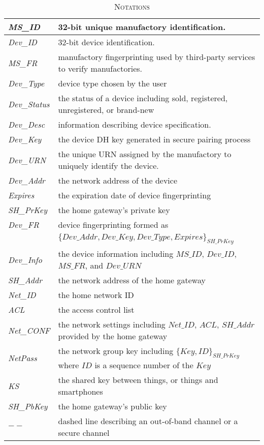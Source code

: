 \begin{table}[t]
\centering
\caption{\textsc{Notations}}
\label{notation}
{\small
\begin{tabular}{| l | p{9cm} |}
 \hline
\emph{MS\_ID} & 32-bit unique manufactory identification. \\ \hline
\emph{Dev\_ID} & 32-bit device identification. \\ \hline
\emph{MS\_FR} & manufactory fingerprinting used by third-party services to verify manufactories. \\ \hline
\emph{Dev\_Type} & device type chosen by the user \\ \hline
\emph{Dev\_Status} & the status of a device including sold, registered, unregistered, or brand-new \\ \hline
\emph{Dev\_Desc} & information describing device specification. \\ \hline
\emph{Dev\_Key} & the device DH key generated in secure pairing process \\ \hline
\emph{Dev\_URN} & the unique URN assigned by the manufactory to uniquely identify the device. \\ \hline
\emph{Dev\_Addr} & the network address of the device \\ \hline
\emph{Expires} & the expiration date of device fingerprinting \\ \hline
\emph{SH\_PrKey} & the home gateway's private key \\ \hline
\emph{Dev\_FR} & device fingerprinting formed as \\
 & $\{Dev\_Addr, Dev\_Key, Dev\_Type, Expires\}_{SH\_PrKey}$ \\ \hline
\emph{Dev\_Info} & the device information including $MS\_ID$, $Dev\_ID$, $MS\_FR$, and $Dev\_URN$ \\ \hline 
\emph{SH\_Addr} & the network address of the home gateway \\ \hline
\emph{Net\_ID} & the home network ID \\ \hline
\emph{ACL} & the access control list \\ \hline
\emph{Net\_CONF} & the network settings including $Net\_ID$, $ACL$, $SH\_Addr$ provided by the home gateway \\ \hline
\emph{NetPass} & the network group key including $\{Key,ID\}_{SH\_PrKey}$ where $ID$ is a sequence number of the $Key$ \\ \hline
\emph{KS} & the shared key between things, or things and smartphones \\ \hline
\emph{SH\_PbKey} & the home gateway's public key \\ \hline
$--$ & dashed line describing an out-of-band channel or a secure channel \\ \hline
 \end{tabular}
}
\end{table}
 
